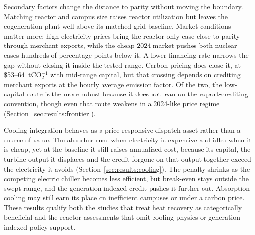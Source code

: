 \documentclass[a4paper,fleqn]{cas-sc}
\begin{document}
Secondary factors change the distance to parity without moving the boundary. Matching reactor and campus size raises reactor utilization but leaves the cogeneration plant well above its matched grid baseline. Market conditions matter more: high electricity prices bring the reactor-only case close to parity through merchant exports, while the cheap 2024 market pushes both nuclear cases hundreds of percentage points below it. A lower financing rate narrows the gap without closing it inside the tested range. Carbon pricing does close it, at \$53--64~tCO$_2^{-1}$ with mid-range capital, but that crossing depends on crediting merchant exports at the hourly average emission factor. Of the two, the low-capital route is the more robust because it does not lean on the export-crediting convention, though even that route weakens in a 2024-like price regime (Section~\ref{sec:results:frontier}).

Cooling integration behaves as a price-responsive dispatch asset rather than a source of value. The absorber runs when electricity is expensive and idles when it is cheap, yet at the baseline it still raises annualized cost, because its capital, the turbine output it displaces and the credit forgone on that output together exceed the electricity it avoids (Section~\ref{sec:results:cooling}). The penalty shrinks as the competing electric chiller becomes less efficient, but break-even stays outside the swept range, and the generation-indexed credit pushes it further out. Absorption cooling may still earn its place on inefficient campuses or under a carbon price. These results qualify both the studies that treat heat recovery as categorically beneficial and the reactor assessments that omit cooling physics or generation-indexed policy support.
\end{document}
